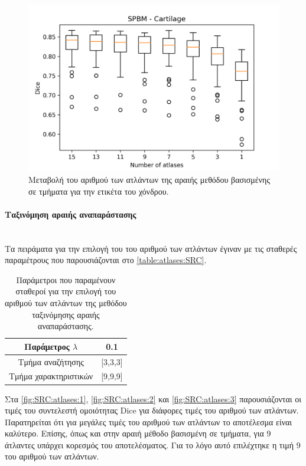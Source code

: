 \documentclass[a4paper,12pt]{article}
\newcommand{\paragraphLine}[1]{\paragraph{#1}\mbox{}\\}
\begin{document}
\begin{figure}[H]
    \centering
    \includegraphics[width=0.85\linewidth]{SPBM_Number_of_atlases_Cartilage_plot.png}
    \caption{Μεταβολή του αριθμού των ατλάντων της αραιής μεθόδου βασισμένης σε
             τμήματα για την ετικέτα του χόνδρου.}
    \label{fig:SPBM:atlases:3}
\end{figure}

\paragraphLine{Ταξινόμηση αραιής αναπαράστασης}

Τα πειράματα για την επιλογή του του αριθμού των ατλάντων έγιναν με τις σταθερές
παραμέτρους που παρουσιάζονται στο \autoref{table:atlases:SRC}.

\begin{table}[h!]
    \centering
    \begin{tabular}{|c|c|} 
        \hline
        Παράμετρος $\lambda$ & 0.1 \\ 
        \hline
        Τμήμα αναζήτησης & [3,3,3] \\ 
        \hline
        Τμήμα χαρακτηριστικών & [9,9,9] \\ 
        \hline
    \end{tabular}
    \caption{Παράμετροι που παραμένουν σταθεροί για την επιλογή του αριθμού των
             ατλάντων της μεθόδου ταξινόμησης αραιής αναπαράστασης.}
    \label{table:atlases:SRC}
\end{table}

Στα \autoref{fig:SRC:atlases:1}, \autoref{fig:SRC:atlases:2} και
\autoref{fig:SRC:atlases:3} παρουσιάζονται οι τιμές του συντελεστή ομοιότητας
Dice για διάφορες τιμές του αριθμού των ατλάντων. Παρατηρείται ότι για μεγάλες
τιμές του αριθμού των ατλάντων το αποτέλεσμα είναι καλύτερο. Επίσης, όπως και
στην αραιή μέθοδο βασισμένη σε τμήματα, για $9$ άτλαντες υπάρχει κορεσμός του
αποτελέσματος. Για το λόγο αυτό επιλέχτηκε η τιμή $9$ του αριθμού των ατλάντων.
\end{document}

